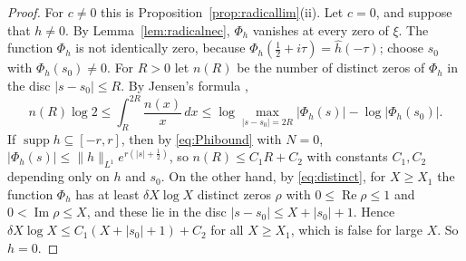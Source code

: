 \documentclass[11pt]{amsart}
\theoremstyle{remark}
\numberwithin{equation}{section}
\newcommand{\Rel}{\operatorname{Re}}
\newcommand{\Iml}{\operatorname{Im}}
\newcommand{\supp}{\operatorname{supp}}
\begin{document}
\begin{proof}
For $c\ne0$ this is Proposition~\ref{prop:radicallim}(ii).  Let $c=0$, and
suppose that $h\ne0$.  By Lemma~\ref{lem:radicalnec}, $\Phi_h$ vanishes at
every zero of $\xi$.  The function $\Phi_h$ is not identically zero, because
$\Phi_h(\tfrac12+i\tau)=\hat h(-\tau)$; choose $s_0$ with
$\Phi_h(s_0)\ne0$.  For $R>0$ let $n(R)$ be the number of distinct zeros of
$\Phi_h$ in the disc $|s-s_0|\le R$.  By Jensen's formula
\cite[\S3.61]{Titchmarsh},
\[
  n(R)\log2\le\int_R^{2R}\frac{n(x)}{x}\,dx
  \le\log\max_{|s-s_0|=2R}|\Phi_h(s)|-\log|\Phi_h(s_0)| .
\]
If $\supp h\subseteq[-r,r]$, then by \eqref{eq:Phibound} with $N=0$,
$|\Phi_h(s)|\le\|h\|_{L^1}e^{r(|s|+\frac12)}$, so $n(R)\le C_1R+C_2$ with
constants $C_1,C_2$ depending only on $h$ and $s_0$.  On the other hand, by
\eqref{eq:distinct}, for $X\ge X_1$ the function $\Phi_h$ has at least
$\delta X\log X$ distinct zeros $\rho$ with $0\le\Rel\rho\le1$ and
$0<\Iml\rho\le X$, and these lie in the disc $|s-s_0|\le X+|s_0|+1$.  Hence
$\delta X\log X\le C_1(X+|s_0|+1)+C_2$ for all $X\ge X_1$, which is false for
large $X$.  So $h=0$.
\end{proof}
\end{document}
